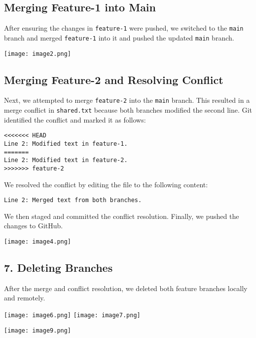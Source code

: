 \documentclass[a4paper,12pt]{article}
\begin{document}
\subsection{Merging Feature-1 into Main}
After ensuring the changes in \texttt{feature-1} were pushed, we switched to the \texttt{main} branch and merged \texttt{feature-1} into it and pushed the updated \texttt{main} branch.

\begin{center}
\texttt{[image: image2.png]} 
    \vspace{0.5cm}
\end{center}
\subsection{Merging Feature-2 and Resolving Conflict}
Next, we attempted to merge \texttt{feature-2} into the \texttt{main} branch. This resulted in a merge conflict in \texttt{shared.txt} because both branches modified the second line. Git identified the conflict and marked it as follows:
\begin{verbatim}
<<<<<<< HEAD
Line 2: Modified text in feature-1.
=======
Line 2: Modified text in feature-2.
>>>>>>> feature-2
\end{verbatim}
We resolved the conflict by editing the file to the following content:
\begin{verbatim}
Line 2: Merged text from both branches.
\end{verbatim}
We then staged and committed the conflict resolution. Finally, we pushed the changes to GitHub.\\

\begin{center}
     \texttt{[image: image4.png]} 
    \vspace{0.5cm}
\end{center}

\subsection*{7. Deleting Branches}
After the merge and conflict resolution, we deleted both feature branches locally and remotely.
\begin{center}
 \texttt{[image: image6.png]}
    \vspace{0.5cm}
     \texttt{[image: image7.png]}
    \vspace{0.5cm}
\end{center}
\begin{center}
\texttt{[image: image9.png]} 
    \vspace{0.5cm}
\end{center}
\end{document}
